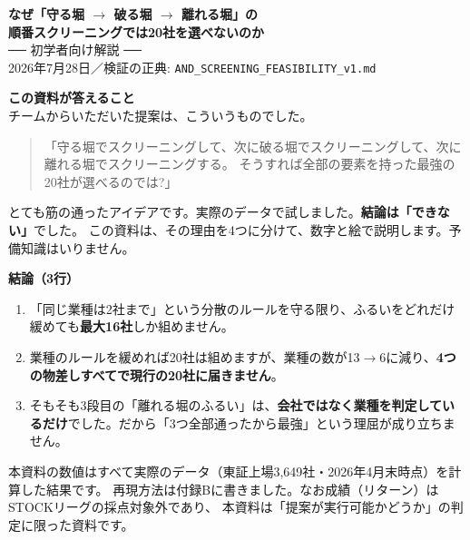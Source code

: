 \documentclass[a4paper,10.5pt]{article}
\begin{document}
\thispagestyle{empty}
\begin{center}
{\sffamily\bfseries\color{navy}\LARGE なぜ「守る堀 $\rightarrow$ 破る堀 $\rightarrow$ 離れる堀」の\\[2pt]
順番スクリーニングでは20社を選べないのか}\\[10pt]
{\sffamily\large ── 初学者向け解説 ──}\\[14pt]
{\small 2026年7月28日\hspace{1.5em}／\hspace{1.5em}検証の正典: \texttt{AND\_SCREENING\_FEASIBILITY\_v1.md}}
\end{center}

\vspace{4pt}

\begin{keybox}
{\sffamily\bfseries\color{navy}この資料が答えること}\\[3pt]
チームからいただいた提案は、こういうものでした。

\begin{quote}
「守る堀でスクリーニングして、次に破る堀でスクリーニングして、次に離れる堀でスクリーニングする。
そうすれば全部の要素を持った最強の20社が選べるのでは?」
\end{quote}

とても筋の通ったアイデアです。実際のデータで試しました。\textbf{結論は「できない」}でした。
この資料は、その理由を4つに分けて、数字と絵で説明します。予備知識はいりません。
\end{keybox}

\begin{keybox}[colback=white,colframe=warn]
{\sffamily\bfseries\color{warn}結論（3行）}
\begin{enumerate}[leftmargin=1.4em,itemsep=2pt,topsep=3pt]
\item 「同じ業種は2社まで」という分散のルールを守る限り、ふるいをどれだけ緩めても\textbf{最大16社}しか組めません。
\item 業種のルールを緩めれば20社は組めますが、業種の数が13$\rightarrow$6に減り、\textbf{4つの物差しすべてで現行の20社に届きません}。
\item そもそも3段目の「離れる堀のふるい」は、\textbf{会社ではなく業種を判定しているだけ}でした。だから「3つ全部通ったから最強」という理屈が成り立ちません。
\end{enumerate}
\end{keybox}

\vfill
{\footnotesize
本資料の数値はすべて実際のデータ（東証上場3,649社・2026年4月末時点）を計算した結果です。
再現方法は付録Bに書きました。なお成績（リターン）はSTOCKリーグの採点対象外であり、
本資料は「提案が実行可能かどうか」の判定に限った資料です。\par}
\end{document}
